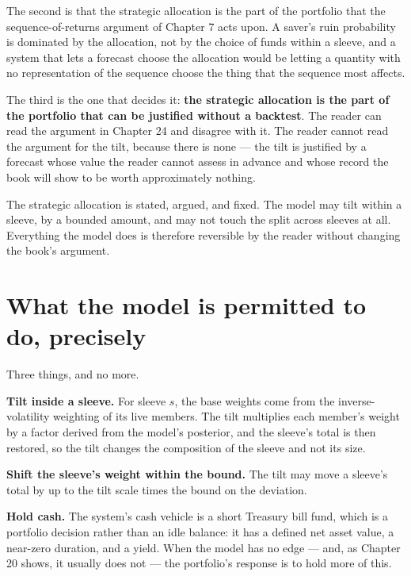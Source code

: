 The second is that the strategic allocation is the part of the portfolio
that the sequence-of-returns argument of Chapter 7 acts upon. A saver's
ruin probability is dominated by the allocation, not by the choice of
funds within a sleeve, and a system that lets a forecast choose the
allocation would be letting a quantity with no representation of the
sequence choose the thing that the sequence most affects.

The third is the one that decides it: \textbf{the strategic allocation is
the part of the portfolio that can be justified without a backtest}. The
reader can read the argument in Chapter 24 and disagree with it. The
reader cannot read the argument for the tilt, because there is none --- the
tilt is justified by a forecast whose value the reader cannot assess in
advance and whose record the book will show to be worth approximately
nothing.

\begin{takeaway}
The strategic allocation is stated, argued, and fixed. The model may tilt
within a sleeve, by a bounded amount, and may not touch the split across
sleeves at all. Everything the model does is therefore reversible by the
reader without changing the book's argument.
\end{takeaway}

\section{What the model is permitted to do, precisely}

Three things, and no more.

\textbf{Tilt inside a sleeve.} For sleeve \(s\), the base weights come
from the inverse-volatility weighting of its live members. The tilt
multiplies each member's weight by a factor derived from the model's
posterior, and the sleeve's total is then restored, so the tilt changes
the composition of the sleeve and not its size.

\textbf{Shift the sleeve's weight within the bound.} The tilt may move a
sleeve's total by up to the tilt scale times the bound on the deviation.

\textbf{Hold cash.} The system's cash vehicle is a short Treasury bill
fund, which is a portfolio decision rather than an idle balance: it has
a defined net asset value, a near-zero duration, and a yield. When the
model has no edge --- and, as Chapter 20 shows, it usually does not --- the
portfolio's response is to hold more of this.

